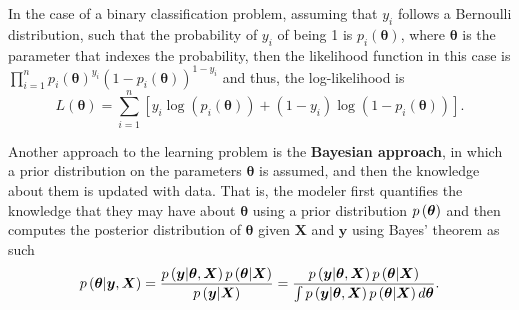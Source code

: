 

In the case of a binary classification problem, assuming that $y_i$ follows a Bernoulli distribution, such that the probability of $y_i$ of being 1 is $p_i(\boldsymbol{\theta})$, where $\boldsymbol{\theta}$ is the parameter that indexes the probability, then the likelihood function in this case is $\prod_{i = 1}^n  p_i(\boldsymbol{\theta})^{y_i}\left(1 - p_i(\boldsymbol{\theta}) \right)^{1 - y_i}$ and thus, the log-likelihood is
\begin{equation}
  L(\boldsymbol{\theta}) = \sum_{i = 1}^n \left[ y_i \log\left( p_i(\boldsymbol{\theta}) \right) + (1 - y_i) \log \left( 1 - p_i(\boldsymbol{\theta}) \right) \right].
\end{equation}

Another approach to the learning problem is the \textbf{Bayesian approach}, in which a prior distribution on the parameters $\boldsymbol{\theta}$ is assumed, and then the knowledge about them is updated with data. That is, the modeler first quantifies the knowledge that they may have about $\boldsymbol{\theta}$ using a prior distribution $p\left( \boldsymbol{\theta} \right)$ and then computes the posterior distribution of $\boldsymbol{\theta}$ given $\boldsymbol{X}$ and $\boldsymbol{y}$ using Bayes' theorem as such
\begin{equation}
  \label{eq:bayes_theorem}
  p\left( \boldsymbol{\theta} | \boldsymbol{y}, \boldsymbol{X}  \right) = \frac{p\left( \boldsymbol{y} | \boldsymbol{\theta}, \boldsymbol{X} \right) p\left( \boldsymbol{\theta} | \boldsymbol{X} \right)}{p\left( \boldsymbol{y} | \boldsymbol{X} \right)} = \frac{p\left( \boldsymbol{y} | \boldsymbol{\theta}, \boldsymbol{X} \right) p\left( \boldsymbol{\theta} | \boldsymbol{X} \right)}{\int p\left( \boldsymbol{y} | \boldsymbol{\theta}, \boldsymbol{X} \right) p\left( \boldsymbol{\theta} | \boldsymbol{X} \right) d\boldsymbol{\theta}}.
\end{equation}

